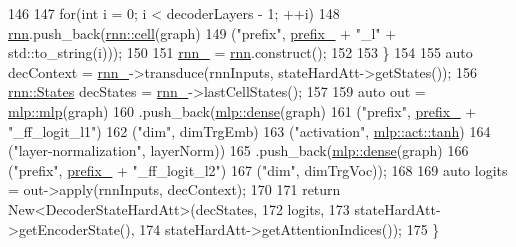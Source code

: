 \begin{DoxyCode}
146 
147       \textcolor{keywordflow}{for}(\textcolor{keywordtype}{int} i = 0; i < decoderLayers - 1; ++i)
148         \hyperlink{namespacemarian_1_1rnn_aff1b115e415945b445f8d4a2068ec3e8}{rnn}.push\_back(\hyperlink{namespacemarian_1_1rnn_af723e51535e0b11de5b28fe19627a3fb}{rnn::cell}(graph)
149                       (\textcolor{stringliteral}{"prefix"}, \hyperlink{classmarian_1_1DecoderBase_a043a90801b6bda9a45e309607136e947}{prefix\_} + \textcolor{stringliteral}{"\_l"} + std::to\_string(i)));
150 
151       \hyperlink{classmarian_1_1DecoderHardAtt_a7e56a5d65ae8e1251b7c4fa572ac99a2}{rnn\_} = \hyperlink{namespacemarian_1_1rnn_aff1b115e415945b445f8d4a2068ec3e8}{rnn}.construct();
152 
153     \}
154 
155     \textcolor{keyword}{auto} decContext = \hyperlink{classmarian_1_1DecoderHardAtt_a7e56a5d65ae8e1251b7c4fa572ac99a2}{rnn\_}->transduce(rnnInputs, stateHardAtt->getStates());
156     \hyperlink{namespaceamunmt_a4fe2912e208820f8217fbcf229ebacf7}{rnn::States} decStates = \hyperlink{classmarian_1_1DecoderHardAtt_a7e56a5d65ae8e1251b7c4fa572ac99a2}{rnn\_}->lastCellStates();
157 
159     \textcolor{keyword}{auto} out = \hyperlink{namespacemarian_1_1mlp_a4d0fe240d31bdc33bcbdb5401de49e27}{mlp::mlp}(graph)
160                .push\_back(\hyperlink{namespacemarian_1_1mlp_a8c25b1e343bf78e66cd9e33e607efeb5}{mlp::dense}(graph)
161                           (\textcolor{stringliteral}{"prefix"}, \hyperlink{classmarian_1_1DecoderBase_a043a90801b6bda9a45e309607136e947}{prefix\_} + \textcolor{stringliteral}{"\_ff\_logit\_l1"})
162                           (\textcolor{stringliteral}{"dim"}, dimTrgEmb)
163                           (\textcolor{stringliteral}{"activation"}, \hyperlink{namespacemarian_1_1mlp_ac16d27a877d16d7394f2057aee439d72a5c0dbba3a6ee4ac0eb26cfee75ccb8b4}{mlp::act::tanh})
164                           (\textcolor{stringliteral}{"layer-normalization"}, layerNorm))
165                .push\_back(\hyperlink{namespacemarian_1_1mlp_a8c25b1e343bf78e66cd9e33e607efeb5}{mlp::dense}(graph)
166                           (\textcolor{stringliteral}{"prefix"}, \hyperlink{classmarian_1_1DecoderBase_a043a90801b6bda9a45e309607136e947}{prefix\_} + \textcolor{stringliteral}{"\_ff\_logit\_l2"})
167                           (\textcolor{stringliteral}{"dim"}, dimTrgVoc));
168 
169     \textcolor{keyword}{auto} logits = out->apply(rnnInputs, decContext);
170 
171     \textcolor{keywordflow}{return} New<DecoderStateHardAtt>(decStates,
172                                     logits,
173                                     stateHardAtt->getEncoderState(),
174                                     stateHardAtt->getAttentionIndices());
175   \}
\end{DoxyCode}


